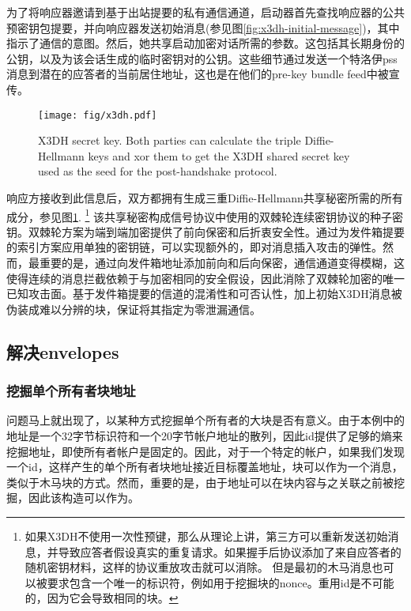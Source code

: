 为了将响应器邀请到基于出站提要的私有通信通道，启动器首先查找响应器的公共预密钥包提要，并向响应器发送初始消息(参见图\ref{fig:x3dh-initial-message})，其中指示了通信的意图。然后，她共享启动加密对话所需的参数。这包括其长期身份的公钥，以及为该会话生成的临时密钥对的公钥。这些细节通过发送一个特洛伊pss消息到潜在的应答者的当前居住地址，这也是在他们的pre-key bundle feed中被宣传。 

\begin{figure}[htbp]
   \centering
   \texttt{[image: fig/x3dh.pdf]}
   \caption[X3DH secret key \statusgreen]{X3DH secret key. Both parties can calculate the triple Diffie-Hellmann keys and xor them to get the X3DH shared secret key used as the seed for the post-handshake protocol.}
   \label{fig:x3dh}
\end{figure}

响应方接收到此信息后，双方都拥有生成三重Diffie-Hellmann共享秘密所需的所有成分，参见图\ref{fig:x3dh}.%
%
\footnote{如果X3DH不使用一次性预键，那么从理论上讲，第三方可以重新发送初始消息，并导致应答者假设真实的重复请求。如果握手后协议添加了来自应答者的随机密钥材料，这样的协议重放攻击就可以消除。 
但是最初的木马消息也可以被要求包含一个唯一的标识符，例如用于挖掘块的nonce。重用id是不可能的，因为它会导致相同的块。}
%
该共享秘密构成信号协议中使用的双棘轮连续密钥协议的种子密钥。双棘轮方案为端到端加密提供了前向保密和后折衷安全性。通过为发件箱提要的索引方案应用单独的密钥链，可以实现额外的，即对消息插入攻击的弹性。然而，最重要的是，通过向发件箱地址添加前向和后向保密，通信通道变得模糊，这使得连续的消息拦截依赖于与加密相同的安全假设，因此消除了双棘轮加密的唯一已知攻击面。基于发件箱提要的信道的混淆性和可否认性，加上初始X3DH消息被伪装成难以分辨的块，保证将其指定为零泄漏通信。

\subsection{解决envelopes\statusgreen}\label{sec:addressed-envelopes}

\subsubsection{挖掘单个所有者块地址}

问题马上就出现了，以某种方式挖掘单个所有者的大块是否有意义。由于本例中的地址是一个32字节标识符和一个20字节帐户地址的散列，因此id提供了足够的熵来挖掘地址，即使所有者帐户是固定的。因此，对于一个特定的帐户，如果我们发现一个id，这样产生的单个所有者块地址接近目标覆盖地址，块可以作为一个消息，类似于木马块的方式。然而，重要的是，由于地址可以在块内容与之关联之前被挖掘，因此该构造可以作为。

